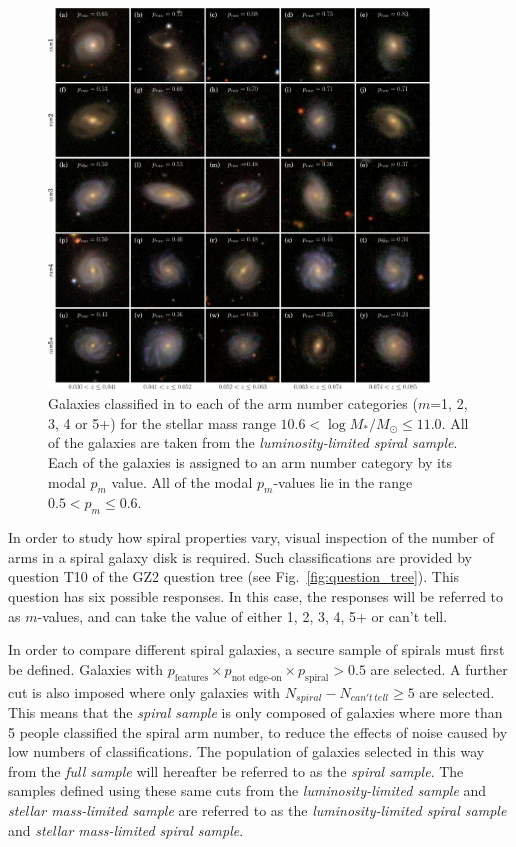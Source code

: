 \documentclass[useAMS,usenatbib]{mn2e}
\begin{document}
\begin{figure}
		\centering

        \includegraphics[width=0.9\textwidth]{Images/Results/image_page_p0506_m106110.pdf}

        \caption{Galaxies classified in to each of the arm number categories ($m$=1, 2, 3, 4 or 5+) for the stellar mass range $10.6 < \log{M_*/M_{\odot}} \leq 11.0$. All of the galaxies are taken from the \textit{luminosity-limited spiral sample}. Each of the galaxies is assigned to an arm number category by its modal $p_m$ value. All of the modal $p_m$-values lie in the range $0.5 < p_m \leq 0.6$.}

        \label{fig:image_panel}

\end{figure}

In order to study how spiral properties vary, visual inspection of the number of arms in a spiral galaxy disk is required. Such classifications are provided by question T10 of the GZ2 question tree (see Fig.~\ref{fig:question_tree}). This question has six possible responses. In this case, the responses will be referred to as $m$-values, and can take the value of either 1, 2, 3, 4, 5+ or can't tell.

In order to compare different spiral galaxies, a secure sample of spirals must first be defined. Galaxies with $p_{\textrm{features}} \times p_{\textrm{not edge-on}} \times p_{\textrm{spiral}} > 0.5$ are selected. A further cut is also imposed where only galaxies with $N_{spiral} - N_{can't \, tell} \geq 5$ are selected. This means that the \textit{spiral sample} is only composed of galaxies where more than 5 people classified the spiral arm number, to reduce the effects of noise caused by low numbers of classifications. The population of galaxies selected in this way from the \textit{full sample} will hereafter be referred to as the \textit{spiral sample}. The samples defined using these same cuts from the \textit{luminosity-limited sample} and \textit{stellar mass-limited sample} are referred to as the \textit{luminosity-limited spiral sample} and \textit{stellar mass-limited spiral sample}.
\end{document}
